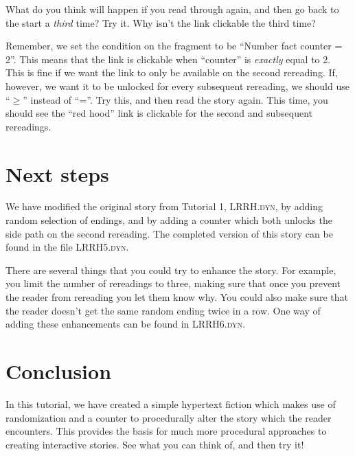 \documentclass{article}
\begin{document}
What do you think will happen if you read through again, and then go 
back to the start a \textit{third} time? Try it. Why isn't the link clickable the third time?

Remember, we set the condition on the fragment to be ``Number fact counter = 2''. This means that the link is clickable when ``counter'' is \textit{exactly} equal to 2. This is fine if we want the link to only be available on the second rereading. If, however, we want it to be unlocked for every subsequent rereading, we should use ``$\ge$'' instead of ``=''. Try this, and then read the story again. This time, you should see the ``red hood'' link is clickable for the second and subsequent rereadings.



\section{Next steps}

We have modified the original story from Tutorial 1, \textsc{LRRH.dyn}, by adding random selection of endings, and by adding a counter which both unlocks the side path on the second rereading. The completed version of this story can be found in the file \textsc{LRRH5.dyn}. 

There are several things that you could try to enhance the story. For  example, you limit the number of rereadings to three, making sure that once 
you prevent the reader from rereading you let them know why. You could also make sure that the reader doesn't get the same random ending twice in a row. One way of adding these enhancements can be found in \textsc{LRRH6.dyn}. 

\section{Conclusion}

In this tutorial, we have created a simple hypertext fiction which makes use of randomization and a counter to procedurally alter the story which the reader encounters. This provides the basis for much more procedural approaches to creating interactive stories. See what you can think of, and then try it!
\end{document}
